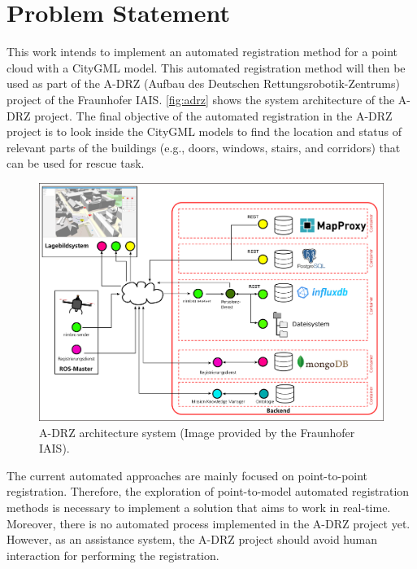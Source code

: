     \section{Problem Statement}
        This work intends to implement an automated registration method for a point cloud with a CityGML model.
        This automated registration method will then be used as part of the A-DRZ (Aufbau des Deutschen Rettungsrobotik-Zentrums) \cite{A-DRZ_online} project of the Fraunhofer IAIS.
        \autoref{fig:adrz} shows the system architecture of the A-DRZ project. 
        The final objective of the automated registration in the A-DRZ project is to look inside the CityGML models
        to find the location and status of relevant parts of the buildings (e.g., doors, windows, stairs, and corridors) that can be used for rescue task.
        
        \begin{figure}[H]
            \includegraphics[width=\textwidth]{images/Systemaufbau.png}
            \caption{A-DRZ architecture system (Image provided by the Fraunhofer IAIS).}
            \label{fig:adrz}
        \end{figure}

        The current automated approaches are mainly focused on point-to-point registration.
        Therefore, the exploration of point-to-model automated registration methods is necessary to implement a solution that aims to work in real-time.
        Moreover, there is no automated process implemented in the A-DRZ project yet. 
        However, as an assistance system, the A-DRZ project should avoid human interaction for performing the registration.

